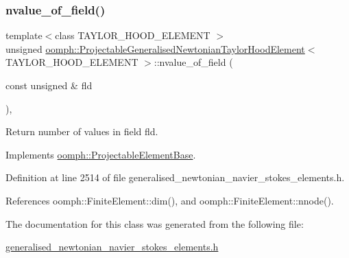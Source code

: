\subsubsection{\texorpdfstring{nvalue\+\_\+of\+\_\+field()}{nvalue\_of\_field()}}
{\footnotesize\ttfamily template$<$class T\+A\+Y\+L\+O\+R\+\_\+\+H\+O\+O\+D\+\_\+\+E\+L\+E\+M\+E\+NT $>$ \\
unsigned \hyperlink{classoomph_1_1ProjectableGeneralisedNewtonianTaylorHoodElement}{oomph\+::\+Projectable\+Generalised\+Newtonian\+Taylor\+Hood\+Element}$<$ T\+A\+Y\+L\+O\+R\+\_\+\+H\+O\+O\+D\+\_\+\+E\+L\+E\+M\+E\+NT $>$\+::nvalue\+\_\+of\+\_\+field (\begin{DoxyParamCaption}\item[{const unsigned \&}]{fld }\end{DoxyParamCaption})\hspace{0.3cm}{\ttfamily [inline]}, {\ttfamily [virtual]}}



Return number of values in field fld. 



Implements \hyperlink{classoomph_1_1ProjectableElementBase_a1a9a6de16f3511bca8e8be770abb9c2e}{oomph\+::\+Projectable\+Element\+Base}.



Definition at line 2514 of file generalised\+\_\+newtonian\+\_\+navier\+\_\+stokes\+\_\+elements.\+h.



References oomph\+::\+Finite\+Element\+::dim(), and oomph\+::\+Finite\+Element\+::nnode().



The documentation for this class was generated from the following file\+:\begin{DoxyCompactItemize}
\item 
\hyperlink{generalised__newtonian__navier__stokes__elements_8h}{generalised\+\_\+newtonian\+\_\+navier\+\_\+stokes\+\_\+elements.\+h}\end{DoxyCompactItemize}
